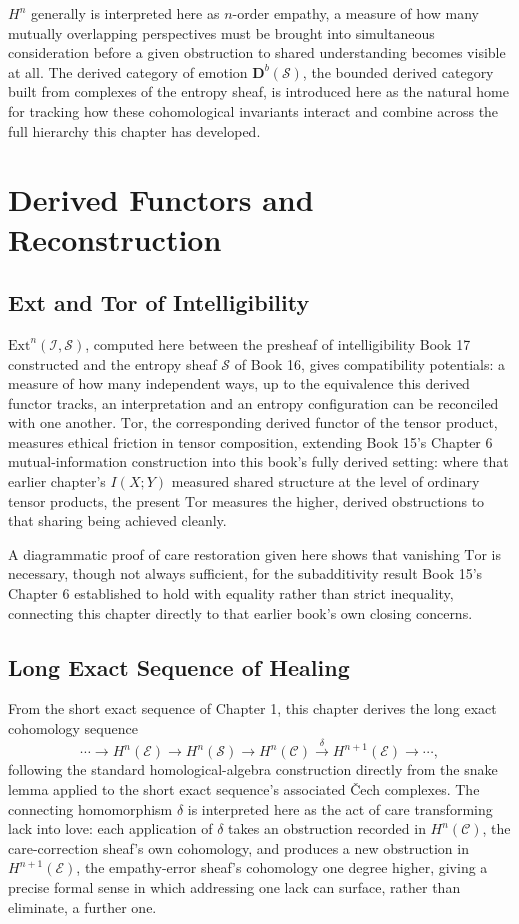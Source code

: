 $H^n$ generally is interpreted here as $n$-order empathy, a measure of how many mutually overlapping perspectives must be brought into simultaneous consideration before a given obstruction to shared understanding becomes visible at all. The derived category of emotion $\mathbf{D}^b(\mathcal{S})$, the bounded derived category built from complexes of the entropy sheaf, is introduced here as the natural home for tracking how these cohomological invariants interact and combine across the full hierarchy this chapter has developed.

\part{Derived Functors and Reconstruction}

\chapter{Ext and Tor of Intelligibility}

$\mathrm{Ext}^n(\mathcal{I}, \mathcal{S})$, computed here between the presheaf of intelligibility Book 17 constructed and the entropy sheaf $\mathcal{S}$ of Book 16, gives compatibility potentials: a measure of how many independent ways, up to the equivalence this derived functor tracks, an interpretation and an entropy configuration can be reconciled with one another. $\mathrm{Tor}$, the corresponding derived functor of the tensor product, measures ethical friction in tensor composition, extending Book 15's Chapter 6 mutual-information construction into this book's fully derived setting: where that earlier chapter's $I(X;Y)$ measured shared structure at the level of ordinary tensor products, the present $\mathrm{Tor}$ measures the higher, derived obstructions to that sharing being achieved cleanly.

A diagrammatic proof of care restoration given here shows that vanishing $\mathrm{Tor}$ is necessary, though not always sufficient, for the subadditivity result Book 15's Chapter 6 established to hold with equality rather than strict inequality, connecting this chapter directly to that earlier book's own closing concerns.

\chapter{Long Exact Sequence of Healing}

From the short exact sequence of Chapter 1, this chapter derives the long exact cohomology sequence
\[
\cdots \to H^n(\mathcal{E}) \to H^n(\mathcal{S}) \to H^n(\mathcal{C}) \xrightarrow{\delta} H^{n+1}(\mathcal{E}) \to \cdots,
\]
following the standard homological-algebra construction directly from the snake lemma applied to the short exact sequence's associated Čech complexes. The connecting homomorphism $\delta$ is interpreted here as the act of care transforming lack into love: each application of $\delta$ takes an obstruction recorded in $H^n(\mathcal{C})$, the care-correction sheaf's own cohomology, and produces a new obstruction in $H^{n+1}(\mathcal{E})$, the empathy-error sheaf's cohomology one degree higher, giving a precise formal sense in which addressing one lack can surface, rather than eliminate, a further one.

